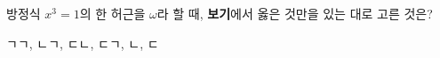 방정식 $x^3=1$의 한 허근을 $\omega$라 할 때, \textbf{보기}에서 옳은 것만을 있는 대로 고른 것은?  
\begin{choices32}{ㄱ}{ㄱ, ㄴ}{ㄱ, ㄷ}{ㄴ, ㄷ}{ㄱ, ㄴ, ㄷ}\end{choices32}
